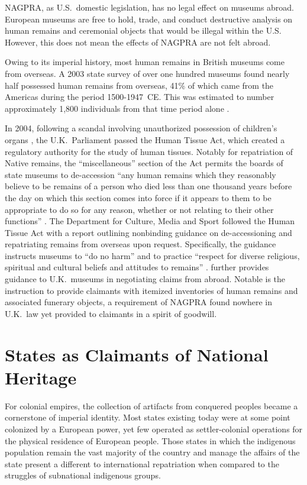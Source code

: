 \documentclass{../../../coursework}
\begin{document}
NAGPRA, as U.S.\ domestic legislation, has no legal effect on museums abroad.
European museums are free to hold, trade, and conduct destructive analysis on
human remains and ceremonial objects that would be illegal within the U.S\@.
However, this does not mean the effects of NAGPRA are not felt abroad.

Owing to its imperial history, most human remains in British museums come from
overseas. A 2003 state survey of over one hundred museums found nearly half
possessed human remains from overseas, 41\% of which came from the Americas
during the period 1500-1947~CE\@. This was estimated to number approximately
1,800 individuals from that time period alone \parencite{Wee03}.

In 2004, following a scandal involving unauthorized possession of children's
organs \parencite[see][]{Bur02}, the U.K.\ Parliament passed the Human Tissue
Act, which created a regulatory authority for the study of human tissues.
Notably for repatriation of Native remains, the ``miscellaneous'' section of
the Act permits the boards of state museums to de-accession ``any human
remains which they reasonably believe to be remains of a person who died less
than one thousand years before the day on which this section comes into force
if it appears to them to be appropriate to do so for any reason, whether or
not relating to their other functions'' \parencite{Hum04}. The Department for
Culture, Media and Sport followed the Human Tissue Act with a report outlining
nonbinding guidance on de-accessioning and repatriating remains from overseas
upon request. Specifically, the guidance instructs museums to ``do no harm''
and to practice ``respect for diverse religious, spiritual and cultural
beliefs and attitudes to remains'' \parencite[14]{Dep05}. \textcite{Gie09}
further provides guidance to U.K.\ museums in negotiating claims from abroad.
Notable is the instruction to provide claimants with itemized inventories of
human remains and associated funerary objects, a requirement of NAGPRA found
nowhere in U.K.\ law yet provided to claimants in a spirit of goodwill. 

\section{States as Claimants of National Heritage}

For colonial empires, the collection of artifacts from conquered peoples
became a cornerstone of imperial identity. Most states existing today were at
some point colonized by a European power, yet few operated as settler-colonial
operations for the physical residence of European people. Those states in
which the indigenous population remain the vast majority of the country and
manage the affairs of the state present a different to international
repatriation when compared to the struggles of subnational indigenous groups.
\end{document}
